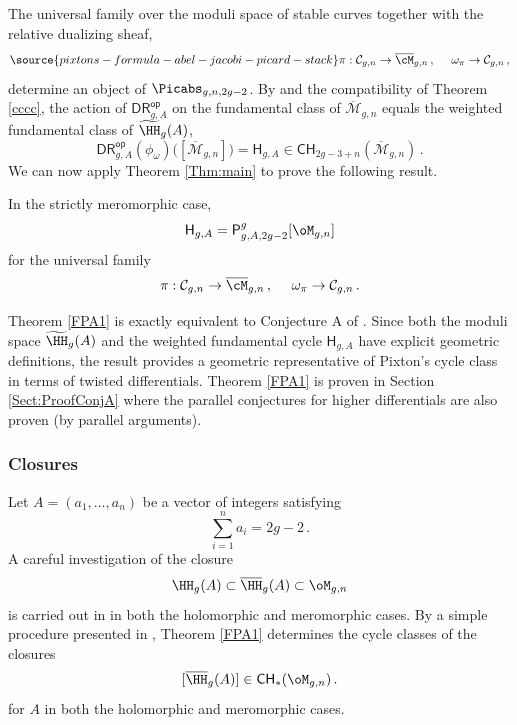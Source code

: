 The
universal family over the moduli space of
stable curves together with the
relative dualizing sheaf,
\begin{equation}\label{rrrr}
\source{pixtons-formula-abel-jacobi-picard-stack}
\pi: \mathcal{C}_{g,n} \rightarrow \overline{\cM}_{g,n}\, , \ \ \ \ \omega_\pi \rightarrow \mathcal{C}_{g,n}\, ,
\end{equation}
determine an object of
$\Picabs_{g,n,2g-2}$.
By \cite{Holmes2019Infinitesimal-s} and
the compatibility of Theorem \ref{cccc},
the action of $\mathsf{DR}^{\mathsf{op}}_{g,A}$ on the fundamental class
of $\overline{\mathcal{M}}_{g,n}$ equals the  weighted
fundamental class of $\widetilde{\HH}_g(A)$,
$$\mathsf{DR}^{\mathsf{op}}_{g,A}(\phi_\omega)\Big( [\overline{\mathcal{M}}_{g,n}]\Big)= \mathsf{H}_{g,A}
\in {\mathsf{CH}}_{2g-3+n}(\overline{\mathcal{M}}_{g,n})
\, .$$
We can now apply Theorem \ref{Thm:main} to prove the following result.

\begin{theorem}
\notready\label{FPA1}
In the strictly meromorphic case,
$$\mathsf{H}_{g,A} = \mathsf{P}_{g,A,2g-2}^g[\oM_{g,n}]$$
for the universal family
$$\pi: \mathcal{C}_{g,n} \rightarrow \overline{\cM}_{g,n}\, ,\ \ \ \
\omega_\pi \rightarrow \mathcal{C}_{g,n}\,. $$
\end{theorem}


Theorem \ref{FPA1} is exactly equivalent to Conjecture A of
\cite[Appendix A]{Farkas2016The-moduli-spac}.
Since both the moduli space  $\widetilde{\HH}_g(A)$ and the weighted
fundamental cycle
$\mathsf{H}_{g,A}$
have explicit geometric definitions,
the result provides a geometric representative
of Pixton's cycle class in terms of twisted differentials.
Theorem \ref{FPA1} is proven in Section \ref{Sect:ProofConjA} where the parallel conjectures \cite{Schmitt2016Dimension-theor}
for higher differentials  are also proven (by parallel  arguments).

\subsubsection{Closures}
Let $A=(a_1,\ldots, a_n)$ be a vector of integers satisfying
$$\sum_{i=1}^n a_i =2g-2\, .$$
A careful investigation of the closure
$$\HH_g(A) \subset \overline{\HH}_g(A) \subset \oM_{g,n}$$
is carried out in \cite{Bainbridge2018Compactificatio} in
both the holomorphic and meromorphic cases.
By a simple procedure presented in \cite[Appendix]{Farkas2016The-moduli-spac},
Theorem \ref{FPA1} determines the cycle classes of the
closures
$$ [\overline{\HH}_g(A)] \in \mathsf{CH}_{*} (\oM_{g,n})\, .$$
for $A$ in both the holomorphic and meromorphic cases.

